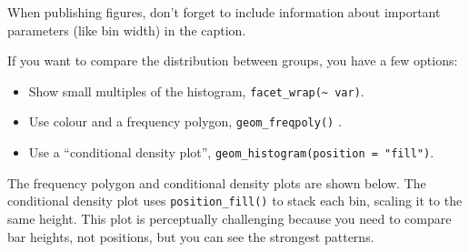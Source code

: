 When publishing figures, don't forget to include information about
important parameters (like bin width) in the caption.

If you want to compare the distribution between groups, you have a few
options:

\begin{itemize}
\tightlist
\item
  Show small multiples of the histogram,
  \texttt{facet\_wrap(\textasciitilde{}\ var)}.
\item
  Use colour and a frequency polygon, \texttt{geom\_freqpoly()} .
   
\item
  Use a ``conditional density plot'',
  \texttt{geom\_histogram(position\ =\ "fill")}.
\end{itemize}

The frequency polygon and conditional density plots are shown below. The
conditional density plot uses \texttt{position\_fill()} to stack each
bin, scaling it to the same height. This plot is perceptually
challenging because you need to compare bar heights, not positions, but
you can see the strongest patterns. 

\begin{Shaded}
\begin{Highlighting}[]
\StringTok{ }
\StringTok{  }\NormalTok{(}\NormalTok{(}  \NormalTok{, } \NormalTok{) +}
\StringTok{  }\NormalTok{(}\NormalTok{, }\NormalTok{) +}\StringTok{ }
\StringTok{  }\NormalTok{(} \NormalTok{)}
\StringTok{ }
\StringTok{  }\NormalTok{(}\NormalTok{(}  \NormalTok{, } \NormalTok{,}
     \NormalTok{) +}
\StringTok{  }\NormalTok{(}\NormalTok{, }\NormalTok{) +}\StringTok{ }
\StringTok{  }\NormalTok{(} \NormalTok{)}
\end{Highlighting}
\end{Shaded}

